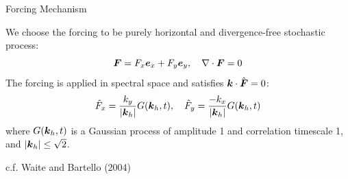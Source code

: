 \documentclass[aspecttatio=169]{beamer}
\begin{document}
\begin{frame}{Forcing Mechanism}

    We choose the forcing to be purely horizontal and divergence-free stochastic
    process:
    \[
        \boldsymbol{F} = F_x\boldsymbol{e}_x + F_y\boldsymbol{e}_y, \quad \nabla \cdot \boldsymbol{F} = 0
    \]
    The forcing is applied in spectral space and satisfies $\boldsymbol{k} \cdot \hat{\boldsymbol{F}} = 0$:
    \begin{gather*}
        \hat{F}_x = \frac{k_y}{|\boldsymbol{k}_h|}G(\boldsymbol{k}_h,t), \quad \hat{F}_y = \frac{-k_x}{|\boldsymbol{k}_h|}G(\boldsymbol{k}_h,t)\\
    \end{gather*}
    where $G(\boldsymbol{k}_h,t)$ is a Gaussian process of amplitude 1 and correlation
    timescale 1, and $|\boldsymbol{k}_h| \le \sqrt{2}$. 

    \begin{flushright}
    c.f. Waite and Bartello (2004)\end{flushright}


\end{frame}
\end{document}
